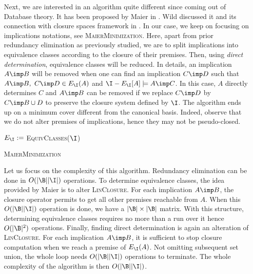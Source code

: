 \documentclass[a4paper, 10pt]{article}
\begin{document}
Next, we are interested in an algorithm quite different since coming out of Database theory. It has been proposed by Maier in \cite{maier_minimum_1980, maier_theory_1983}. Wild discussed it and its connection with closure spaces framework in \cite{wild_implicational_1989}. In our case, we keep on focusing on implications notations, see \textsc{MaierMinimization}. Here, apart from prior redundancy elimination as previously studied, we are to split implications into equivalence classes according to the closure of their premises. Then, using \textit{direct determination}, equivalence classes will be
reduced. In details, an implication $A \imp B$ will be removed when one can find
an implication $C \imp D$ such that $A \imp B, \ C \imp D \in E_{\I}(A)$ and $\I - E_{\I}[A] \models A \imp C$. In this case, $A$ directly determines $C$ and
$A \imp B$ can be removed if we replace $C \imp D$ by $C \imp B \cup D$ to preserve the closure system defined by $\I$. The algorithm ends up on a minimum
cover different from the canonical basis. Indeed, observe that we do not alter 
premises of implications, hence they may not be pseudo-closed.

\begin{algorithm}
	
	\BlankLine
	\BlankLine
	
	
	\BlankLine
	
	$E_{\I} := $ \textsc{EquivClasses}($\I$) \;
	
	\BlankLine
	
	
	\caption{\textsc{MaierMinimization}}
	\label{alg:Maier-Min}
\end{algorithm}

Let us focus on the complexity of this algorithm. Redundancy elimination can be done in $O(|\B||\I|)$ operations. To determine equivalence classes, the idea provided by Maier is to alter \textsc{LinClosure}. For each implication $A \imp B$, the closure operator permits to get all other premises reachable from $A$. When this $O(|\B||\I|)$ operation is done, we have a $|\B| \times |\B|$ matrix. With this structure, determining equivalence classes requires no more than a run
over it hence $O(|\B|^2)$ operations. Finally, finding direct determination is again an alteration of \textsc{LinClosure}. For each implication $A \imp B$, it is sufficient to stop closure computation when we reach a premise of $E_{\I}(A)$. Not omitting subsequent set union, the whole loop needs $O(|\B||\I|)$ operations to terminate. The whole complexity of the algorithm is then $O(|\B||\I|)$.
\end{document}
